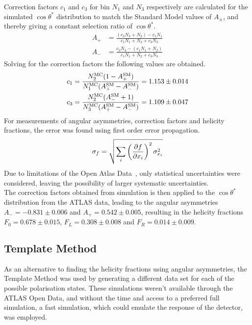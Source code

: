 \documentclass[12pt,a4paper]{article}
\numberwithin{equation}{section}
\begin{document}
Correction factors $c_1$ and $c_3$ for bin $N_1$ and $N_3$ respectively are
calculated for the simulated $\cos\theta^*$ distribution to match the Standard Model
values of $A_{\pm}$, and thereby giving a constant selection ratio of $\cos\theta^*$.
\newcommand{\MC}{\mathrm{MC}}
\newcommand{\SM}{\mathrm{SM}}
\begin{align}
	A_{+} &= \frac{(c_3N_3 + N_2) - c_1N_1}{c_1N_1 + N_2 + c_3N_3} \\
	A_{-} &= \frac{c_3N_3 - (c_1N_1 + N_2)}{c_1N_1 + N_2 + c_3N_3}
\end{align}
Solving for the correction factors the following values are obtained.
\begin{align} \label{eq:correction}
	c_1 &= \frac{N_2^{\MC}(1-A_{+}^{\SM})}{N_1^{\MC}(A_{+}^{\SM} -A_{-}^{\SM})} = \num{1.153 +- 0.014}  \\
	c_3 &= \frac{N_2^{\MC}(A_{-}^{\SM}+1)}{N_3^{\MC}(A_{+}^{\SM}-A_{-}^{\SM})} = \num{1.109 +- 0.047}
\end{align}
For measurements of angular asymmetries, correction factors and helicity
fractions, the error was found using first order error propagation.
\begin{align}
	\sigma_{f} = \sqrt{\sum_{i}\left(\pdv{f}{x_i}\right)^2\sigma_{x_i}^2}
\end{align}
Due to limitations of the Open Atlas Data~\cite{oreach2020}, only statistical
uncertainties were considered, leaving the possibility of larger systematic
uncertainties.\\

The correction factors obtained from simulation is then applied to the
$\cos\theta^{*}$ distribution from the ATLAS data, leading to the angular asymmetries
$A_- = -0.831 \pm 0.006$ and $A_+ = 0.542 \pm 0.005$, resulting in the helicity
fractions $F_0=0.678 \pm 0.015$, $F_L=0.308 \pm 0.008$ and $F_R=0.014 \pm 0.009$.

\subsection{Template Method}
As an alternative to finding the helicity fractions using angular asymmetries,
the Template Method was used by generating a different data set for each of the
possible polarisation states. These simulations weren't available through the
ATLAS Open Data, and without the time and access to a preferred full simulation,
a fast simulation, which could emulate the response of the detector,
was employed.\\
\end{document}
